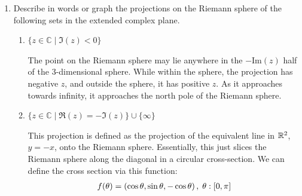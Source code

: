 \begin{enumerate}
    \item Describe in words or graph the projections on the Riemann sphere of the following sets in the extended complex plane. 
    \begin{enumerate}
        \item $\{z \in \mathbb{C} \mid \Im(z) <0\}$
		\begin{problem}
			The point on the Riemann sphere may lie anywhere in the $-\text{Im}(z)$ half of the 3-dimensional sphere. While within the sphere, the projection has negative $z$, and outside the sphere, it has positive $z$. As it approaches towards infinity, it approaches the north pole of the Riemann sphere. 
		\end{problem}
        \item $\{z \in \mathbb{C} \mid \Re(z) = -\Im(z) \} \cup \{ \infty\}$
		\begin{problem}
			This projection is defined as the projection of the equivalent line in $\mathbb{R}^2$, $y = -x$, onto the Riemann sphere. Essentially, this just slices the Riemann sphere along the diagonal in a circular cross-section. We can define the cross section via this function:
			\begin{align*}
				f(\theta) = \left(\cos\theta,\sin\theta, -\cos\theta\right), \;\theta:[0, \pi]
			\end{align*}
		\end{problem}
    \end{enumerate}
    

\end{enumerate}
